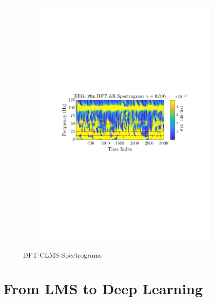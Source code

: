 \documentclass[12pt]{article}
\begin{document}
\begin{figure}[H]
\begin{subfigure}{0.49\textwidth}
					\includegraphics[trim={2.2cm 11.2cm 2.90cm  11.2cm}, clip, width=\textwidth]{../MATLAB/figures/q3_3d_fig04.pdf} 
					\captionsetup{justification=centering}
				\end{subfigure}
				
				\captionsetup{justification=centering}
				\caption{DFT-CLMS Spectrograms}
				\label{fig: 3-3d}
			\end{figure}
			
	
	
\pagebreak
\section{From LMS to Deep Learning} \label{sec: 4-LMS-to-DL}
\end{document}

